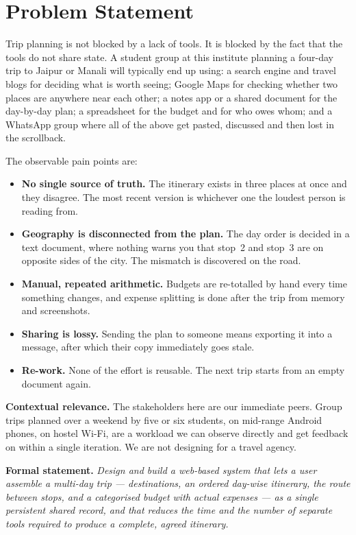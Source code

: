 \documentclass[11pt,a4paper]{article}
\begin{document}
\section{Problem Statement}
Trip planning is not blocked by a lack of tools. It is
blocked by the fact that the tools do not share state.
A student group at this institute planning a four-day
trip to Jaipur or Manali will typically end up using:
a search engine and travel blogs for deciding what is
worth seeing; Google Maps for checking whether two
places are anywhere near each other; a notes app or a
shared document for the day-by-day plan; a spreadsheet
for the budget and for who owes whom; and a WhatsApp
group where all of the above get pasted, discussed and
then lost in the scrollback.

The observable pain points are:

\begin{itemize}[leftmargin=0.7cm]
    \item \textbf{No single source of truth.} The
      itinerary exists in three places at once and they
      disagree. The most recent version is whichever
      one the loudest person is reading from.
    \item \textbf{Geography is disconnected from the
      plan.} The day order is decided in a text
      document, where nothing warns you that stop~2 and
      stop~3 are on opposite sides of the city. The
      mismatch is discovered on the road.
    \item \textbf{Manual, repeated arithmetic.}
      Budgets are re-totalled by hand every time
      something changes, and expense splitting is done
      after the trip from memory and screenshots.
    \item \textbf{Sharing is lossy.} Sending the plan
      to someone means exporting it into a message,
      after which their copy immediately goes stale.
    \item \textbf{Re-work.} None of the effort is
      reusable. The next trip starts from an empty
      document again.
\end{itemize}

\textbf{Contextual relevance.} The stakeholders here
are our immediate peers. Group trips planned over a
weekend by five or six students, on mid-range Android
phones, on hostel Wi-Fi, are a workload we can observe
directly and get feedback on within a single iteration.
We are not designing for a travel agency.

\textbf{Formal statement.} \emph{Design and build a
  web-based system that lets a user assemble a
  multi-day trip --- destinations, an ordered day-wise
  itinerary, the route between stops, and a categorised
  budget with actual expenses --- as a single persistent
  shared record, and that reduces the time and the
  number of separate tools required to produce a
  complete, agreed itinerary.}
\end{document}
